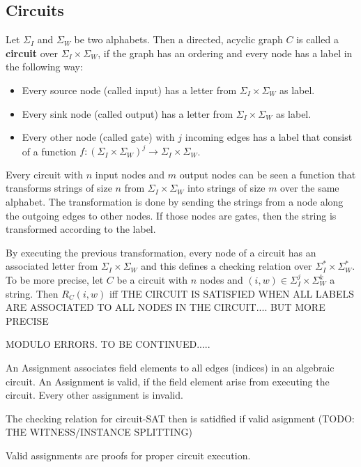 \subsection{Circuits} 
\begin{definition}[Circuits] Let $\Sigma_I$ and $\Sigma_W$ be two alphabets. Then a directed, acyclic graph $C$ is called a \textbf{circuit} over $\Sigma_I \times \Sigma_W$, if the graph has an ordering and every node has a label in the following way:
\begin{itemize}
\item Every source node (called input) has a letter from $\Sigma_I \times \Sigma_W$ as label.
\item Every sink node (called output) has a letter from $\Sigma_I \times \Sigma_W$ as label.
\item Every other node (called gate) with $j$ incoming edges has a label that consist of a function $f: \left(\Sigma_I \times \Sigma_W\right)^j \to \Sigma_I \times \Sigma_W$.
\end{itemize}
\end{definition}
\begin{remark} Every circuit with $n$ input nodes and $m$ output nodes can be seen a function that transforms strings of size $n$ from $\Sigma_I \times \Sigma_W$ into strings of size $m$ over the same alphabet. The transformation is done by sending the strings from a node along the outgoing edges to other nodes. If those nodes are gates, then the string is transformed according to the label.

By executing the previous transformation, every node of a circuit has an associated letter from $\Sigma_I \times \Sigma_W$ and this defines a checking relation over $\Sigma_I^* \times \Sigma_W^*$. To be more precise, let $C$ be a circuit with $n$ nodes and $(i,w) \in \Sigma_I^j \times \Sigma_W^k$ a string. Then $R_C(i,w)$ iff THE CIRCUIT IS SATISFIED WHEN ALL LABELS ARE ASSOCIATED TO ALL NODES IN THE CIRCUIT.... BUT MORE PRECISE

MODULO ERRORS. TO BE CONTINUED.....

An Assignment associates field elements to all edges (indices) in an algebraic circuit. An Assignment is valid, if the field element arise from executing the circuit. Every other assignment is invalid.

The checking relation for circuit-SAT then is satidfied if valid asignment (TODO: THE WITNESS/INSTANCE SPLITTING)

Valid assignments are proofs for proper circuit execution.
\end{remark}



